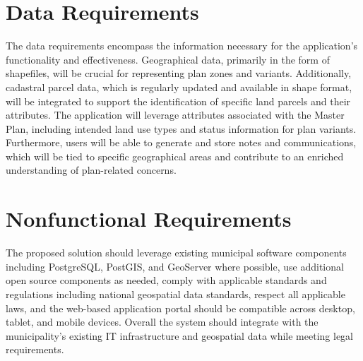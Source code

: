 \section{Data Requirements}\label{sec:data-requirements}
The data requirements encompass the information necessary for the application's functionality and effectiveness.
Geographical data, primarily in the form of shapefiles, will be crucial for representing plan zones and variants.
Additionally, cadastral parcel data, which is regularly updated and available in shape format, will be integrated to support the identification of specific land parcels and their attributes.
The application will leverage attributes associated with the Master Plan, including intended land use types and status information for plan variants.
Furthermore, users will be able to generate and store notes and communications, which will be tied to specific geographical areas and contribute to an enriched understanding of plan-related concerns.

\section{Nonfunctional Requirements}\label{sec:nonfunctional-requirements}
The proposed solution should leverage existing municipal software components including PostgreSQL, PostGIS, and GeoServer where possible, use additional open source components as needed, comply with applicable standards and regulations including national geospatial data standards, respect all applicable laws, and the web-based application portal should be compatible across desktop, tablet, and mobile devices.
Overall the system should integrate with the municipality's existing IT infrastructure and geospatial data while meeting legal requirements.

